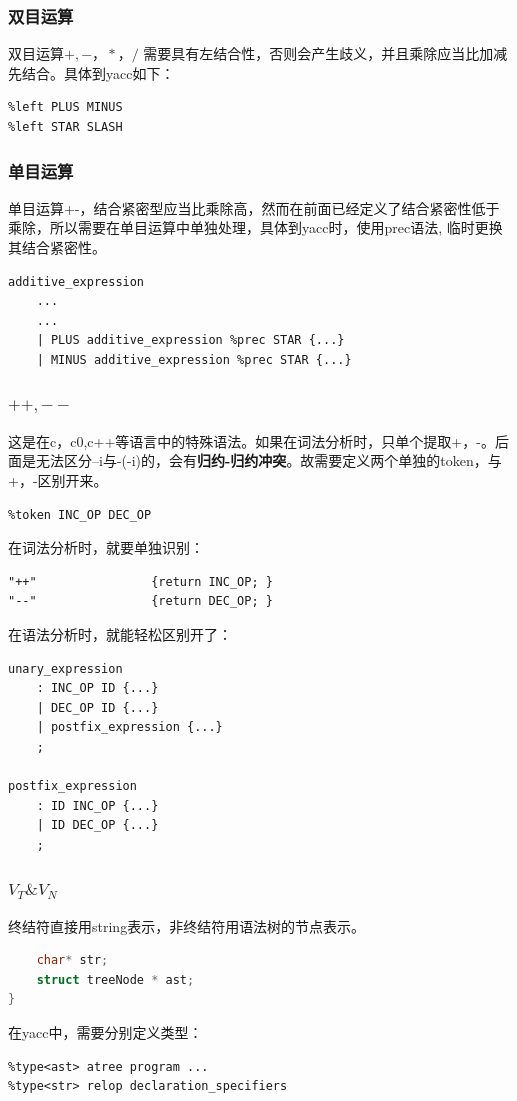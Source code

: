 \documentclass{article}
\begin{document}
\begin{CJK}{UTF8}{gkai}
\subsubsection{双目运算}
双目运算$+,-，*，/$ 需要具有左结合性，否则会产生歧义，并且乘除应当比加减先结合。具体到yacc如下：
\begin{verbatim}
%left PLUS MINUS
%left STAR SLASH
\end{verbatim}
\subsubsection{单目运算}
单目运算+-，结合紧密型应当比乘除高，然而在前面已经定义了结合紧密性低于乘除，所以需要在单目运算中单独处理，具体到yacc时，使用prec语法, 临时更换其结合紧密性。
\begin{verbatim}
additive_expression
    ...
    ...
    | PLUS additive_expression %prec STAR {...}
    | MINUS additive_expression %prec STAR {...}
\end{verbatim}
\subsubsection{$++,--$}
这是在c，c0,c++等语言中的特殊语法。如果在词法分析时，只单个提取+，-。后面是无法区分--i与-(-i)的，会有\textbf{归约-归约冲突}。故需要定义两个单独的token，与+，-区别开来。
\begin{verbatim}
%token INC_OP DEC_OP
\end{verbatim}
在词法分析时，就要单独识别：
\begin{verbatim}
"++"				{return INC_OP; }
"--"				{return DEC_OP; }
\end{verbatim}
在语法分析时，就能轻松区别开了：
\begin{verbatim}
unary_expression 
    : INC_OP ID {...}
    | DEC_OP ID {...}
    | postfix_expression {...}
    ;

postfix_expression
    : ID INC_OP {...}
    | ID DEC_OP {...}
    ;
\end{verbatim}
\subsubsection{$V_T \& V_N$}
终结符直接用string表示，非终结符用语法树的节点表示。
\begin{lstlisting}[language=c]
%union {
    char* str;
    struct treeNode * ast;
}
\end{lstlisting}
在yacc中，需要分别定义类型：
\begin{verbatim}
%type<ast> atree program ...
%type<str> relop declaration_specifiers 
\end{verbatim}


\end{CJK}
\end{document}
